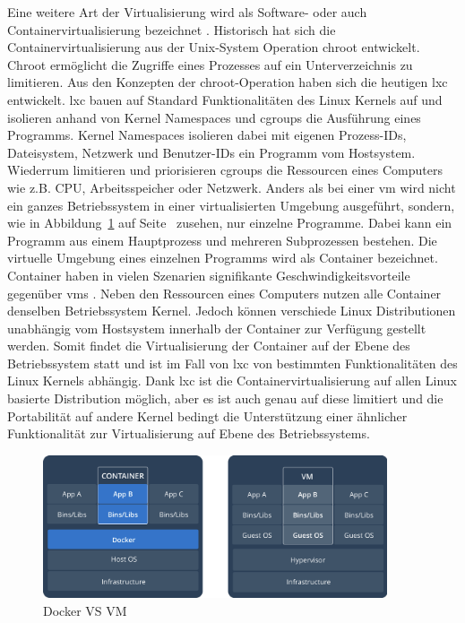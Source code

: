 Eine weitere Art der Virtualisierung wird als Software- oder auch Containervirtualisierung bezeichnet \cite{software_container}. Historisch hat sich die Containervirtualisierung aus der Unix-System Operation chroot entwickelt. Chroot ermöglicht die Zugriffe eines Prozesses auf ein Unterverzeichnis zu limitieren. Aus den Konzepten der chroot-Operation haben sich die heutigen \ac{lxc} entwickelt. \ac{lxc} bauen auf Standard Funktionalitäten des Linux Kernels auf und isolieren anhand von Kernel Namespaces und cgroups die Ausführung eines Programms. Kernel Namespaces isolieren dabei mit eigenen Prozess-IDs, Dateisystem, Netzwerk und Benutzer-IDs ein Programm vom Hostsystem. Wiederrum limitieren und priorisieren cgroups die Ressourcen eines Computers wie z.B. CPU, Arbeitsspeicher oder Netzwerk. Anders als bei einer \ac{vm} wird nicht ein ganzes Betriebssystem in einer virtualisierten Umgebung ausgeführt, sondern, wie in Abbildung~\ref{fig:DOCKER_VS_VM} auf Seite~\pageref{fig:DOCKER_VS_VM} zusehen, nur einzelne Programme. Dabei kann ein Programm aus einem Hauptprozess und mehreren Subprozessen bestehen. Die virtuelle Umgebung eines einzelnen Programms wird als Container bezeichnet. Container haben in vielen Szenarien signifikante Geschwindigkeitsvorteile gegenüber \acp{vm} \cite{performance_container}. Neben den Ressourcen eines Computers nutzen alle Container denselben Betriebssystem Kernel. Jedoch können verschiede Linux Distributionen unabhängig vom Hostsystem innerhalb der Container zur Verfügung gestellt werden. Somit findet die Virtualisierung der Container auf der Ebene des Betriebssystem statt und ist im Fall von \ac{lxc} von bestimmten Funktionalitäten des Linux Kernels abhängig. Dank \ac{lxc} ist die Containervirtualisierung auf allen Linux basierte Distribution möglich, aber es ist auch genau auf diese limitiert und die Portabilität auf andere Kernel bedingt die Unterstützung einer ähnlicher Funktionalität zur Virtualisierung auf Ebene des Betriebssystems.

\begin{figure}
    \centering
    \includegraphics[width=4in]{figures/docker-vs-vm.png}
    \caption[Docker VS VM]
    {Docker VS VM \cite{what_container}}
    \label{fig:DOCKER_VS_VM}
\end{figure}

